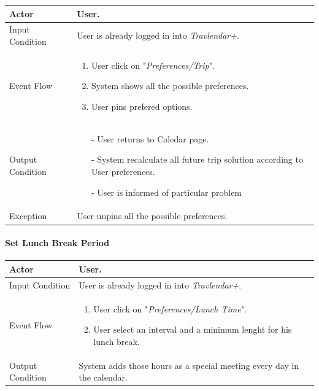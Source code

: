 		\begin{tabular}{| l | p{} | }
			\hline
			\hline
			Actor	&		User. \\
			\hline
			Input Condition		&		User is already logged in into \textit{Travlendar+}. \\
			\hline
			Event Flow		&		\begin{enumerate}
												\item User click on "\textit{Preferences/Trip}".
												\item System shows all the possible preferences.
												\item User pins prefered options.
											\end{enumerate} \\
			\hline
			Output Condition		&		\begin{itemize}
													\item[-] User returns to Caledar page.
													\item[-] System recalculate all future trip solution according to User preferences.
													\item[-] User is informed of particular problem
												\end{itemize} \\
			\hline
			Exception		&		User unpins all the possible preferences. \\
			
			\hline
			\hline
		\end{tabular}
		
		

	\paragraph{ Set Lunch Break Period}
	
		\begin{tabular}{| l | p{} | }
			\hline
			\hline
			Actor	&		User. \\
			\hline
			Input Condition		&		User is already logged in into \textit{Travlendar+}. \\
			\hline
			Event Flow		&		\begin{enumerate}
												\item User click on "\textit{Preferences/Lunch Time}".
												\item User select an interval and a minimum lenght for his lunch break.
											\end{enumerate} \\
			\hline
			Output Condition		&		System adds those hours as a special meeting every day in the calendar. \\
			\hline
			\hline
		\end{tabular}

